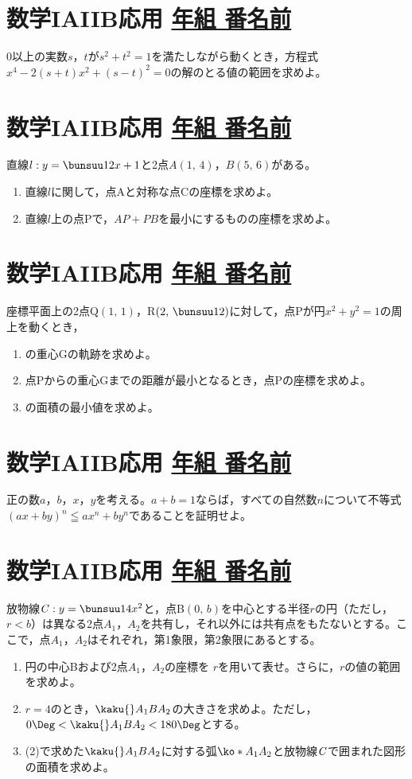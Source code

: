 \documentclass[b5j]{jarticle}
\def\Name#1{\section{\large\bf  #1\hfill
\underline{ \hspace{1zw}年\hspace{2zw}組\hspace{2zw}
番名前\hspace{12zw}}}}
\begin{document}
\Name{数学IAIIB応用}
\hakosyokika
0以上の実数$s$，$t$が$s^{2}+t^{2}=1$を満たしながら動くとき，方程式$x^{4}-2(s+t)x^{2}+(s-t)^{2}=0$の解のとる値の範囲を求めよ。
\newpage


\Name{数学IAIIB応用}
\hakosyokika
\begin{caprm}
直線$l:y=\bunsuu12x+1$と2点$A(1,\,4)$，$B(5,\,6)$がある。
\begin{enumerate}
\item 直線$l$に関して，点Aと対称な点Cの座標を求めよ。
\item 直線$l$上の点Pで，$AP+PB$を最小にするものの座標を求めよ。
\end{enumerate}
\end{caprm}%
\newpage

\Name{数学IAIIB応用}
\hakosyokika
\begin{caprm}
座標平面上の2点Q$(1,\,1)$，R$\left(2,\,\bunsuu12\right)$に対して，点Pが円$x^{2}+y^{2}=1$の周上を動くとき，
\begin{enumerate}
\item {}の重心Gの軌跡を求めよ。
\item 点Pからの重心Gまでの距離が最小となるとき，点Pの座標を求めよ。

\item {}の面積の最小値を求めよ。

\end{enumerate}

\end{caprm}
\newpage

\Name{数学IAIIB応用}
\hakosyokika
正の数$a$，$b$，$x$，$y$を考える。$a+b=1$ならば，すべての自然数$n$について不等式$(ax+by)^{n}\leqq ax^{n}+by^{n}$であることを証明せよ。
\newpage

\Name{数学IAIIB応用}
\hakosyokika
\begin{caprm}
放物線${\it C}:y=\bunsuu14x^{2}$と，点B$(0,\,b)$を中心とする半径$r$の円（ただし，$r<b$）は異なる2点$A_{1}$，$A_{2}$を共有し，それ以外には共有点をもたないとする。ここで，点$A_{1}$，$A_{2}$はそれぞれ，第1象限，第2象限にあるとする。

\begin{enumerate}
\item 円の中心Bおよび2点$A_{1}$，$A_{2}$の座標を
$r$を用いて表せ。さらに，$r$の値の範囲を求めよ。

\item $r=4$のとき，$\kaku{}A_{1}BA_{2}$の大きさを求めよ。ただし，$0\Deg<\kaku{}A_{1}BA_{2}<180\Deg$とする。



\item (2)で求めた$\kaku{}A_{1}BA_{2}$に対する弧$\ko*{A_{1}A_{2}}$と放物線${\it C}$で囲まれた図形の面積を求めよ。

\end{enumerate}


\end{caprm}%
\end{document}
